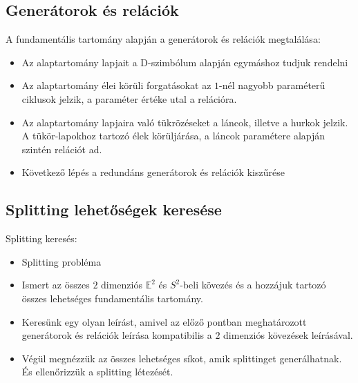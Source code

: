 \subsection{Generátorok és relációk}
\begin{frame}
  A fundamentális tartomány alapján a generátorok és relációk megtalálása:
  \begin{itemize}
    \item Az alaptartomány lapjait a D-szimbólum alapján egymáshoz tudjuk
      rendelni
    \item Az alaptartomány élei körüli forgatásokat az $1$-nél nagyobb
      paraméterű ciklusok jelzik, a paraméter értéke utal a relációra.
    \item Az alaptartomány lapjaira való tükrözéseket a láncok, illetve a hurkok
      jelzik. A tükör-lapokhoz tartozó élek körüljárása, a láncok paramétere
      alapján szintén relációt ad.
    \item Következő lépés a redundáns generátorok és relációk kiszűrése
  \end{itemize}
\end{frame}

\subsection{Splitting lehetőségek keresése}
\begin{frame}
  Splitting keresés:
  \begin{itemize}
    \item Splitting probléma
    \item Ismert az összes $2$ dimenziós $\mathbb{E}^2$ és $S^2$-beli kövezés és
      a hozzájuk tartozó összes lehetséges fundamentális tartomány.
    \item Keresünk egy olyan leírást, amivel az előző pontban meghatározott
      generátorok és relációk leírása kompatibilis a $2$ dimenziós kövezések
      leírásával.
    \item Végül megnézzük az összes lehetséges síkot, amik splittinget
      generálhatnak. És ellenőrizzük a splitting létezését.
  \end{itemize}
\end{frame}

